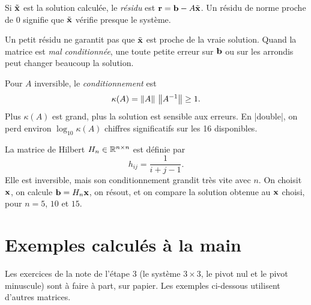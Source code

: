 \begin{definition}[Résidu]
Si $\tilde{\mathbf{x}}$ est la solution calculée, le
\emph{résidu} est $\mathbf{r} = \mathbf{b} - A\tilde{\mathbf{x}}$.
Un résidu de norme proche de $0$ signifie que
$\tilde{\mathbf{x}}$ vérifie presque le système.
\end{definition}

\begin{importantbox}
Un petit résidu ne garantit pas que
$\tilde{\mathbf{x}}$ est proche de la vraie solution.
Quand la matrice est \emph{mal conditionnée}, une
toute petite erreur sur $\mathbf{b}$ ou sur les arrondis
peut changer beaucoup la solution.
\end{importantbox}

\begin{definition}[Conditionnement]
Pour $A$ inversible, le \emph{conditionnement} est
\[
    \kappa(A) = \left\|A\right\|\,\left\|A^{-1}\right\| \ge 1.
\]
Plus $\kappa(A)$ est grand, plus la solution est
sensible aux erreurs. En \cpp|double|, on perd
environ $\log_{10} \kappa(A)$ chiffres significatifs
sur les 16 disponibles.
\end{definition}

\begin{example}
La matrice de Hilbert $H_n \in \mathbb{R}^{n \times n}$ est
définie par
\[
    h_{ij} = \frac{1}{i + j - 1}.
\]
Elle est inversible, mais son conditionnement grandit
très vite avec $n$. On choisit $\mathbf{x}$, on calcule
$\mathbf{b} = H_n \mathbf{x}$, on résout, et on compare la
solution obtenue au $\mathbf{x}$ choisi, pour
$n = 5$, $10$ et $15$.
\end{example}

\section{Exemples calculés à la main}

Les exercices de la note de l'étape 3 (le système
$3 \times 3$, le pivot nul et le pivot minuscule)
sont à faire à part, sur papier. Les exemples
ci-dessous utilisent d'autres matrices.

